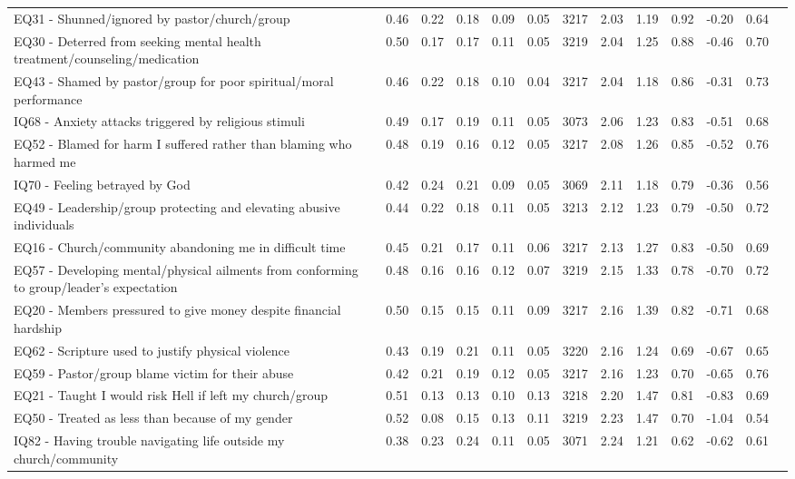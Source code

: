 \documentclass[
]{article}
\begin{document}
\begin{longtable}[t]{>{\raggedright\arraybackslash}p{2cm}cccccccccccc}
EQ31 - Shunned/ignored by pastor/church/group & 0.46 & 0.22 & 0.18 & 0.09 & 0.05 & 3217 & 2.03 & 1.19 & 0.92 & -0.20 & 0.64 & \\
\addlinespace
EQ30 - Deterred from seeking mental health treatment/counseling/medication & 0.50 & 0.17 & 0.17 & 0.11 & 0.05 & 3219 & 2.04 & 1.25 & 0.88 & -0.46 & 0.70 & \\
EQ43 - Shamed by pastor/group for poor spiritual/moral performance & 0.46 & 0.22 & 0.18 & 0.10 & 0.04 & 3217 & 2.04 & 1.18 & 0.86 & -0.31 & 0.73 & \\
IQ68 - Anxiety attacks triggered by religious stimuli & 0.49 & 0.17 & 0.19 & 0.11 & 0.05 & 3073 & 2.06 & 1.23 & 0.83 & -0.51 & 0.68 & \\
EQ52 - Blamed for harm I suffered rather than blaming who harmed me & 0.48 & 0.19 & 0.16 & 0.12 & 0.05 & 3217 & 2.08 & 1.26 & 0.85 & -0.52 & 0.76 & \\
IQ70 - Feeling betrayed by God & 0.42 & 0.24 & 0.21 & 0.09 & 0.05 & 3069 & 2.11 & 1.18 & 0.79 & -0.36 & 0.56 & \\
\addlinespace
EQ49 - Leadership/group protecting and elevating abusive individuals & 0.44 & 0.22 & 0.18 & 0.11 & 0.05 & 3213 & 2.12 & 1.23 & 0.79 & -0.50 & 0.72 & \\
EQ16 - Church/community abandoning me in difficult time & 0.45 & 0.21 & 0.17 & 0.11 & 0.06 & 3217 & 2.13 & 1.27 & 0.83 & -0.50 & 0.69 & \\
EQ57 - Developing mental/physical ailments from conforming to group/leader’s expectation & 0.48 & 0.16 & 0.16 & 0.12 & 0.07 & 3219 & 2.15 & 1.33 & 0.78 & -0.70 & 0.72 & \\
EQ20 - Members pressured to give money despite financial hardship & 0.50 & 0.15 & 0.15 & 0.11 & 0.09 & 3217 & 2.16 & 1.39 & 0.82 & -0.71 & 0.68 & \\
EQ62 - Scripture used to justify physical violence & 0.43 & 0.19 & 0.21 & 0.11 & 0.05 & 3220 & 2.16 & 1.24 & 0.69 & -0.67 & 0.65 & \\
\addlinespace
EQ59 - Pastor/group blame victim for their abuse & 0.42 & 0.21 & 0.19 & 0.12 & 0.05 & 3217 & 2.16 & 1.23 & 0.70 & -0.65 & 0.76 & \\
EQ21 - Taught I would risk Hell if left my church/group & 0.51 & 0.13 & 0.13 & 0.10 & 0.13 & 3218 & 2.20 & 1.47 & 0.81 & -0.83 & 0.69 & \\
EQ50 - Treated as less than because of my gender & 0.52 & 0.08 & 0.15 & 0.13 & 0.11 & 3219 & 2.23 & 1.47 & 0.70 & -1.04 & 0.54 & \\
IQ82 - Having trouble navigating life outside my church/community & 0.38 & 0.23 & 0.24 & 0.11 & 0.05 & 3071 & 2.24 & 1.21 & 0.62 & -0.62 & 0.61 & \\

\end{longtable}
\end{document}
